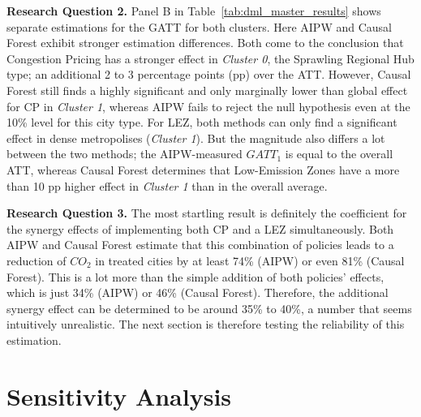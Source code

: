 \documentclass[12pt, a4paper]{article}
\begin{document}
\textbf{Research Question 2. } Panel B in Table~\ref{tab:dml_master_results} shows separate estimations for the GATT for both clusters. Here AIPW and Causal Forest exhibit stronger estimation differences. Both come to the conclusion that Congestion Pricing has a stronger effect in \textit{Cluster 0}, the Sprawling Regional Hub type; an additional 2 to 3 percentage points (pp) over the ATT. However, Causal Forest still finds a highly significant and only marginally lower than global effect for CP in \textit{Cluster 1}, whereas AIPW fails to reject the null hypothesis even at the 10\% level for this city type. For LEZ, both methods can only find a significant effect in dense metropolises (\textit{Cluster 1}). But the magnitude also differs a lot between the two methods; the AIPW-measured $GATT_1$ is equal to the overall ATT, whereas Causal Forest determines that Low-Emission Zones have a more than 10 pp higher effect in \textit{Cluster 1} than in the overall average.

\textbf{Research Question 3. } The most startling result is definitely the coefficient for the synergy effects of implementing both CP and a LEZ simultaneously. Both AIPW and Causal Forest estimate that this combination of policies leads to a reduction of $CO_2$ in treated cities by at least 74\% (AIPW) or even 81\% (Causal Forest). This is a lot more than the simple addition of both policies' effects, which is just 34\% (AIPW) or 46\% (Causal Forest). Therefore, the additional synergy effect can be determined to be around 35\% to 40\%, a number that seems intuitively unrealistic. The next section is therefore testing the reliability of this estimation.

\section{Sensitivity Analysis}
\label{sec:sensitivity_analysis}
\end{document}
